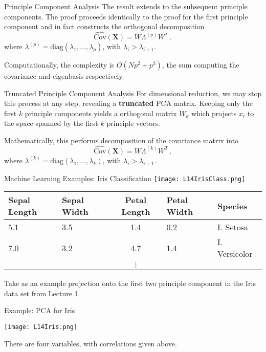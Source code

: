 \documentclass[10pt, table, dvipsnames,xcdraw,handout]{beamer}
\newcommand{\bfX}{\ensuremath{\mathbf{X}}}
\begin{document}
\begin{frame}[fragile]{Principle Component Analysis}
The result extends to the subsequent principle components. The proof proceeds identically to the proof for the first principle component and in fact constructs the orthogonal decomposition 
$$
\widehat{\text{Cov}}(\bfX)  = W\Lambda^{(p)}W^T\,,
$$
where $\lambda^{(p)} = \text{diag}(\lambda_1,\ldots, \lambda_p)$, with $\lambda_i>\lambda_{i+1}$.\pause

Computationally, the complexity is $O(Np^2 + p^3)$, the sum computing the covariance and eigenbasis respectively. 
\end{frame}



\begin{frame}[fragile]{Truncated Principle Component Analysis}
For dimensional reduction, we may stop this process at any step, revealing a \textbf{truncated} PCA matrix. Keeping only the first $k$ principle components yields a orthogonal matrix $W_{k}$ which projects $x_i$ to the space spanned by the first $k$ principle vectors. \pause 

Mathematically, this performs decomposition of the covariance matrix into 
$$
\widehat{\text{Cov}}(\bfX)  = W\Lambda^{(k)}W^T\,,
$$
where $\lambda^{(k)} = \text{diag}(\lambda_1,\ldots, \lambda_k)$, with $\lambda_i>\lambda_{i+1}$\,.
\end{frame}


\begin{frame}[fragile]{Machine Learning Examples: Iris Classification}
\texttt{[image: L14IrisClass.png]}

\begin{tabular}{llcll}
\textbf{Sepal Length} & \textbf{Sepal Width} & \textbf{Petal Length} & \textbf{Petal Width} & \textbf{Species}\\ \hline
 	5.1 &	3.5 &	1.4 &	0.2 &	I. Setosa         \\ \hline
7.0 	& 3.2  &	4.7 &	1.4 &	I. Versicolor         \\ \hline
&&$\vdots$
\end{tabular}

Take as an example projection onto the first two principle component in the Iris data set from Lecture 1. 
\end{frame}


\begin{frame}[fragile]{Example: PCA for Iris}
  \begin{minipage}[t][0.7\textheight][t]{\textwidth}
	\centering \texttt{[image: L14Iris.png]} 
  \end{minipage}
  \vfill
\begin{minipage}[t][0.3\textheight][t]{\textwidth}
There are four variables, with correlations given above. 
\end{minipage}
\end{frame}
\end{document}
